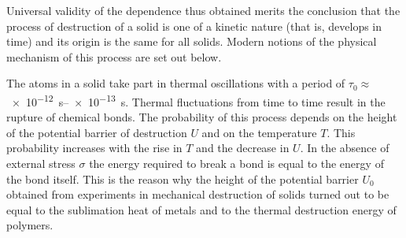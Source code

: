 \begin{table}[!b]
	\renewcommand{\arraystretch}{1.2}
	\caption{}
	\vspace{-0.6cm}
	\label{table:2_6}
	\begin{center}\end{center}
\end{table}

Universal validity of the dependence thus obtained merits the conclusion that the process of destruction of a solid is one of a kinetic nature (that is, develops in time) and its origin is the same for all solids. Modern notions of the physical mechanism of this process are set out below.

The atoms in a solid take part in thermal oscillations with a period of $\tau_0 \approx$ \SIrange{e-12}{e-13}{\second}. Thermal fluctuations from time to time result in the rupture of chemical bonds. The probability of this process depends on the height of the potential barrier of destruction $U$ and on the temperature $T$. This probability increases with the rise in $T$ and the decrease in $U$. In the absence of external stress $\sigma$ the energy required to break a bond is equal to the energy of the bond itself. This is the reason why the height of the potential barrier $U_0$ obtained from experiments in mechanical destruction of solids turned out to be equal to the sublimation heat of metals and to the thermal destruction energy of polymers.

